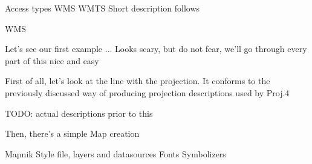 \documentclass{beamer}
\begin{document}
\begin{frame}{Access types}
  WMS
  WMTS
  Short description follows
\end{frame}

\begin{frame}{WMS}

\end{frame}

Let's see our first example
...
Looks scary, but do not fear, we'll go through every part of this nice and easy

First of all, let's look at the line with the projection. It conforms to the
previously discussed way of producing projection descriptions used by Proj.4

TODO: actual descriptions prior to this

Then, there's a simple Map creation



Mapnik
Style file, layers and datasources
Fonts
Symbolizers
\end{document}
